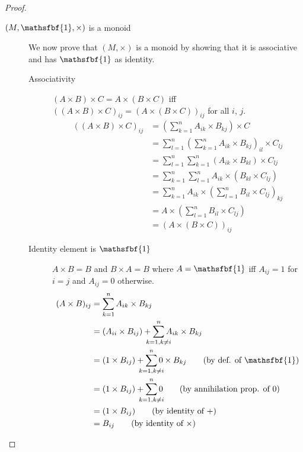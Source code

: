 \documentclass[runningheads]{llncs}
\renewcommand{\otimes}{\times}
\begin{document}
\begin{proof}
\begin{description}
		\item[\((M, \mathsfbf{1} , \otimes )\) is a monoid]
			We now prove that \((M, \otimes )\) is a monoid by showing that it is associative and has \(\mathsfbf{1} \) as identity.

			\begin{description}
				\item [Associativity]
				      \((A \otimes B) \otimes C = A \otimes (B \otimes C)\) iff \(((A \otimes B) \otimes C) _{ij} = (A \otimes (B \otimes C))_{ij}\) for all \(i\), \(j\).
				      \begin{align*}
					      ((A \otimes B) \otimes C) _{ij} & = (\sum_{k=1}^{n} A_{ik} \times B_{kj}) \otimes C                                                  \\
					                                      & = \sum_{l=1}^{n} (\sum_{k=1}^{n} A_{ik} \times B_{kj})_{il} \times C_{lj}                          \\
					                                      & = \sum_{l=1}^{n} \sum_{k=1}^{n} (A_{ik} \times B_{kl}) \times C_{lj}                               \\
					                                      & = \sum_{k=1}^{n} \sum_{l=1}^{n} A_{ik} \times (B_{kl} \times C_{lj})\tag{by assoc. of \(\times \)} \\
					                                      & = \sum_{k=1}^{n} A_{ik} \times (\sum_{l=1}^{n} B_{il} \times C_{lj})_{kj}                          \\
					                                      & = A \otimes (\sum_{l=1}^{n} B_{il} \times C_{lj})                                                  \\
					                                      & = (A \otimes ( B \otimes C))_{ij}
				      \end{align*}

				\item[Identity element is \(\mathsfbf{1} \)] \(A \otimes B = B \) and \(B \otimes A = B \) where \(A = \mathsfbf{1} \) iff \(A_{ij} = 1\) for \(i = j\) and \(A_{ij} = 0\) otherwise.
					\begin{align*}
						(A \otimes B)_{ij} & = \sum_{k=1}^{n} A_{ik} \times B_{kj}                                                                      \\
						                   & = (A_{ii} \times B_{ij}) + \sum_{\mathclap{k=1,k \neq i}}^{n} A_{ik} \times B_{kj}                         \\
						                   & = (1 \times B_{ij}) + \sum_{\mathclap{k=1,k \neq i}}^{n} 0 \times B_{kj}\tag{by def. of \(\mathsfbf{1} \)} \\
						                   & = (1 \times B_{ij}) + \sum_{\mathclap{k=1,k \neq i}}^{n} 0\tag{by annihilation prop. of \(0\)}             \\
						                   & = (1 \times B_{ij}) \tag{by identity of \(+\)}                                                             \\
						                   & = B_{ij} \tag{by identity of \(\times \)}
					\end{align*}


\end{description}
\end{description}
\end{proof}
\end{document}
